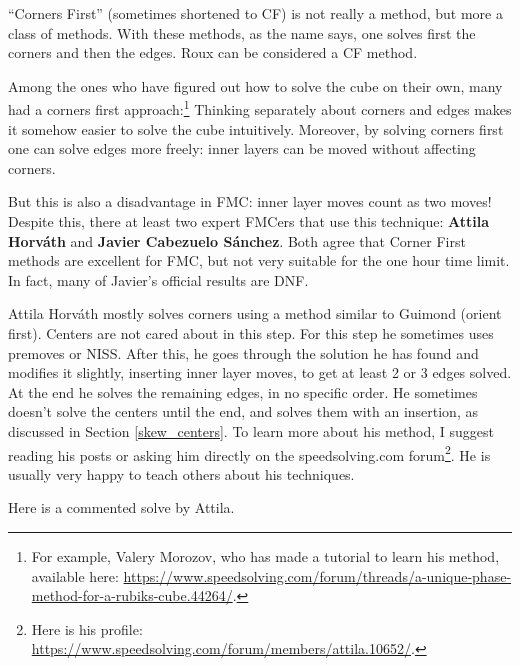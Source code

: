 \documentclass[11pt,a4paper]{book}
\begin{document}
``Corners First'' (sometimes shortened to CF) is not really a method, but more a class of methods. With these methods, as the name says, one solves first the corners and then the edges. Roux can
 be considered a CF method.

Among the ones who have figured out how to solve the cube on their own, many had a corners first approach:\footnote{For example, Valery Morozov, who has made a tutorial to learn his method, available here: \url{https://www.speedsolving.com/forum/threads/a-unique-phase-method-for-a-rubiks-cube.44264/}.} Thinking separately about corners and edges makes it somehow easier to solve the cube intuitively. Moreover, by solving corners first one can solve edges more freely: inner layers can be moved without affecting corners.

But this is also a disadvantage in FMC: inner layer moves count as two moves! Despite this, there at least two expert FMCers that use this technique: \textbf{Attila Horváth} and \textbf{Javier Cabezuelo Sánchez}. Both agree that Corner First methods are excellent for FMC, but not very suitable for the one hour time limit. In fact, many of Javier's official results are DNF.

Attila Horváth mostly solves corners using a method similar to Guimond (orient first). Centers are not cared about in this step. For this step he sometimes uses premoves or NISS. After this, he goes through the solution he has found and modifies it slightly, inserting inner layer moves, to get at least 2 or 3 edges solved. At the end he solves the remaining edges, in no specific order. He sometimes doesn't solve the centers until the end, and solves them with an insertion, as discussed in Section \ref{skew_centers}. To learn more about his method, I suggest reading his posts or asking him directly on the speedsolving.com forum\footnote{Here is his profile: \url{https://www.speedsolving.com/forum/members/attila.10652/}.}. He is usually very happy to teach others about his techniques. 

Here is a commented solve by Attila.
\end{document}
